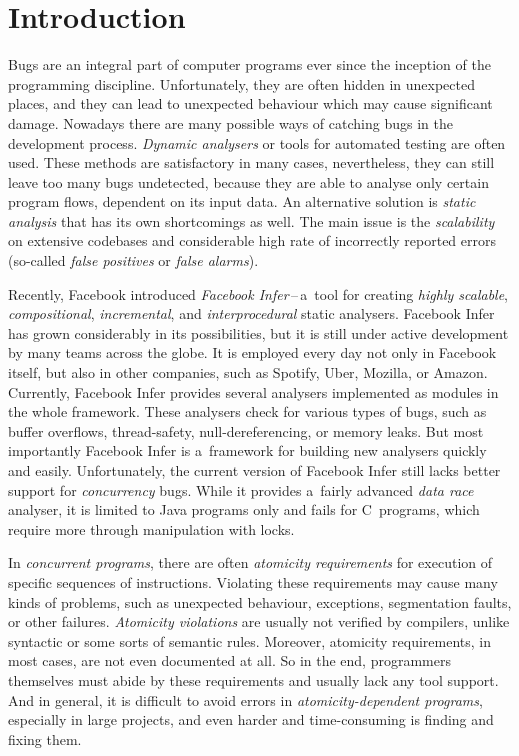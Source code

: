 

\chapter{Introduction}

Bugs are an integral part of computer programs ever since the inception
of the programming discipline. Unfortunately, they are often hidden
in unexpected places, and they can lead to unexpected behaviour which
may cause significant damage. Nowadays there are many possible
ways of catching bugs in the development process. \emph{Dynamic analysers}
or tools for automated testing are often used. These methods
are satisfactory in many cases, nevertheless, they can still leave
too many bugs undetected, because they are able to analyse only
certain program flows, dependent on its input data. An alternative
solution is \emph{static analysis} that has its own shortcomings as
well. The main issue is the \emph{scalability} on extensive codebases and
considerable high rate of incorrectly reported errors (so-called
\emph{false positives} or \emph{false alarms}).

Recently, Facebook introduced \emph{Facebook Infer}\,--\,a~tool for
creating \emph{highly scalable}, \emph{compositional}, \emph{incremental},
and \emph{interprocedural} static analysers. Facebook Infer has grown
considerably in its possibilities, but it is still under active development
by many teams across the globe. It is employed every day not only in
Facebook itself, but also in other companies, such as Spotify, Uber, Mozilla,
or Amazon. Currently, Facebook Infer provides several analysers implemented
as modules in the whole framework. These analysers check for various types
of bugs, such as buffer overflows, thread-safety, null-dereferencing, or
memory leaks. But most importantly Facebook Infer is a~framework for building
new analysers quickly and easily. Unfortunately, the current version of
Facebook Infer still lacks better support for \emph{concurrency} bugs.
While it provides a~fairly advanced \emph{data race} analyser, it is
limited to Java programs only and fails for C~programs, which require
more through manipulation with locks.

In \emph{concurrent programs}, there are often \emph{atomicity requirements}
for execution of specific sequences of instructions. Violating these
requirements may cause many kinds of problems, such as unexpected
behaviour, exceptions, segmentation faults, or other failures.
\emph{Atomicity violations} are usually not verified by compilers,
unlike syntactic or some sorts of semantic rules. Moreover, atomicity
requirements, in most cases, are not even documented at all. So in the
end, programmers themselves must abide by these requirements and usually
lack any tool support. And in general, it is difficult to avoid
errors in \emph{atomicity-dependent programs}, especially in large projects,
and even harder and time-consuming is finding and fixing them.

